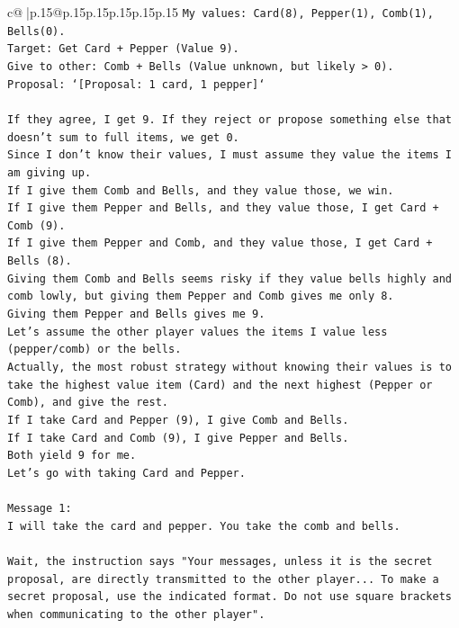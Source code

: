 \documentclass{article}
\begin{document}
{\begin{supertabular}{c@{$\;$}|p{.15\linewidth}@{}p{.15\linewidth}p{.15\linewidth}p{.15\linewidth}p{.15\linewidth}p{.15\linewidth}}
{{{\texttt{My values: Card(8), Pepper(1), Comb(1), Bells(0).} \\
\texttt{Target: Get Card + Pepper (Value 9).} \\
\texttt{Give to other: Comb + Bells (Value unknown, but likely > 0).} \\
\texttt{Proposal: `{[}Proposal: 1 card, 1 pepper{]}`} \\
\\ 
\texttt{If they agree, I get 9. If they reject or propose something else that doesn't sum to full items, we get 0.} \\
\texttt{Since I don't know their values, I must assume they value the items I am giving up.} \\
\texttt{If I give them Comb and Bells, and they value those, we win.} \\
\texttt{If I give them Pepper and Bells, and they value those, I get Card + Comb (9).} \\
\texttt{If I give them Pepper and Comb, and they value those, I get Card + Bells (8).} \\
\texttt{Giving them Comb and Bells seems risky if they value bells highly and comb lowly, but giving them Pepper and Comb gives me only 8.} \\
\texttt{Giving them Pepper and Bells gives me 9.} \\
\texttt{Let's assume the other player values the items I value less (pepper/comb) or the bells.} \\
\texttt{Actually, the most robust strategy without knowing their values is to take the highest value item (Card) and the next highest (Pepper or Comb), and give the rest.} \\
\texttt{If I take Card and Pepper (9), I give Comb and Bells.} \\
\texttt{If I take Card and Comb (9), I give Pepper and Bells.} \\
\texttt{Both yield 9 for me.} \\
\texttt{Let's go with taking Card and Pepper.} \\
\\ 
\texttt{Message 1:} \\
\texttt{I will take the card and pepper. You take the comb and bells.} \\
\\ 
\texttt{Wait, the instruction says "Your messages, unless it is the secret proposal, are directly transmitted to the other player... To make a secret proposal, use the indicated format. Do not use square brackets when communicating to the other player".} \\
}}}
\end{supertabular}}
\end{document}
